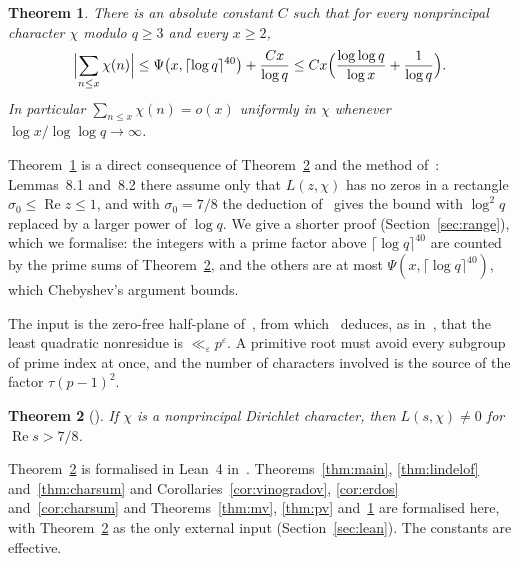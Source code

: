 \documentclass[12pt]{amsart}
\newtheorem{theorem}{Theorem}[section]
\theoremstyle{remark}
\renewcommand{\Re}{\operatorname{Re}}
\begin{document}
\begin{theorem}\label{thm:range}
There is an absolute constant $C$ such that for every nonprincipal character $\chi$ modulo
$q\ge3$ and every $x\ge2$,
\[
  \Bigl|\sum_{n\le x}\chi(n)\Bigr|\le\Psi\bigl(x,\lceil\log q\rceil^{40}\bigr)+\frac{Cx}{\log q}
  \le Cx\Bigl(\frac{\log\log q}{\log x}+\frac1{\log q}\Bigr).
\]
In particular $\sum_{n\le x}\chi(n)=o(x)$ uniformly in $\chi$ whenever $\log x/\log\log q\to\infty$.
\end{theorem}

Theorem~\ref{thm:range} is a direct consequence of Theorem~\ref{thm:zerofree} and the method
of~\cite{GS01}: Lemmas~8.1 and~8.2 there assume only that $L(z,\chi)$ has no zeros in a rectangle
$\sigma_0\le\Re z\le1$, and with $\sigma_0=7/8$ the deduction of~\cite[Thm.~2]{GS01} gives the
bound with $\log^2q$ replaced by a larger power of $\log q$. We give a shorter proof
(Section~\ref{sec:range}), which we formalise: the integers with a prime factor above
$\lceil\log q\rceil^{40}$ are counted by the prime sums of Theorem~\ref{thm:zerofree}, and the
others are at most $\Psi(x,\lceil\log q\rceil^{40})$, which Chebyshev's argument bounds.

The input is the zero-free half-plane of~\cite{OAI26}, from which~\cite{OAI26} deduces, as
in~\cite[Thm.~6.7]{BIMS17}, that the least quadratic nonresidue is $\ll_\varepsilon p^\varepsilon$.
A primitive root must avoid every subgroup of prime index at once, and the number of characters
involved is the source of the factor $\tau(p-1)^2$.

\begin{theorem}[{\cite{OAI26}}]\label{thm:zerofree}
If $\chi$ is a nonprincipal Dirichlet character, then $L(s,\chi)\ne0$ for $\Re s>7/8$.
\end{theorem}

Theorem~\ref{thm:zerofree} is formalised in Lean~4 in~\cite{OAI26}. Theorems~\ref{thm:main},
\ref{thm:lindelof} and~\ref{thm:charsum} and Corollaries~\ref{cor:vinogradov}, \ref{cor:erdos}
and~\ref{cor:charsum} and Theorems~\ref{thm:mv}, \ref{thm:pv} and~\ref{thm:range} are formalised
here, with
Theorem~\ref{thm:zerofree} as the only external input (Section~\ref{sec:lean}). The constants are
effective.
\end{document}
